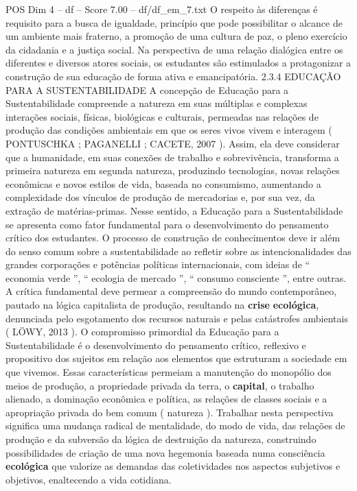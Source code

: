 \begin{textsample}{POS Dim 4 – df – Score 7.00 – df/df\_em\_7.txt}
O respeito às diferenças é requisito para a busca de igualdade, princípio que pode possibilitar o alcance de um ambiente mais fraterno, a promoção de uma cultura de paz, o pleno exercício da cidadania e a justiça social.
Na perspectiva de uma relação dialógica entre os diferentes e diversos atores sociais, os estudantes são estimulados a protagonizar a construção de sua educação de forma ativa e emancipatória. 2.3.4 EDUCAÇÃO PARA A SUSTENTABILIDADE A concepção de Educação para a Sustentabilidade compreende a natureza em suas múltiplas e complexas interações sociais, físicas, biológicas e culturais, permeadas nas relações de produção das condições ambientais em que os seres vivos vivem e interagem ( PONTUSCHKA ; PAGANELLI ; CACETE, 2007 ).
Assim, ela deve considerar que a humanidade, em suas conexões de trabalho e sobrevivência, transforma a primeira natureza em segunda natureza, produzindo tecnologias, novas relações econômicas e novos estilos de vida, baseada no consumismo, aumentando a complexidade dos vínculos de produção de mercadorias e, por sua vez, da extração de matérias-primas.
Nesse sentido, a Educação para a Sustentabilidade se apresenta como fator fundamental para o desenvolvimento do pensamento crítico dos estudantes.
O processo de construção de conhecimentos deve ir além do senso comum sobre a sustentabilidade ao refletir sobre as intencionalidades das grandes corporações e potências políticas internacionais, com ideias de “ economia verde ”, “ ecologia de mercado ”, “ consumo consciente ”, entre outras.
A crítica fundamental deve permear a compreensão do mundo contemporâneo, pautado na lógica capitalista de produção, resultando na \textbf{crise} \textbf{ecológica}, denunciada pelo esgotamento dos recursos naturais e pelas catástrofes ambientais ( LÖWY, 2013 ).
O compromisso primordial da Educação para a Sustentabilidade é o desenvolvimento do pensamento crítico, reflexivo e propositivo dos sujeitos em relação aos elementos que estruturam a sociedade em que vivemos.
Essas características permeiam a manutenção do monopólio dos meios de produção, a propriedade privada da terra, o \textbf{capital}, o trabalho alienado, a dominação econômica e política, as relações de classes sociais e a apropriação privada do bem comum ( natureza ).
Trabalhar nesta perspectiva significa uma mudança radical de mentalidade, do modo de vida, das relações de produção e da subversão da lógica de destruição da natureza, construindo possibilidades de criação de uma nova hegemonia baseada numa consciência \textbf{ecológica} que valorize as demandas das coletividades nos aspectos subjetivos e objetivos, enaltecendo a vida cotidiana.

\end{textsample}
